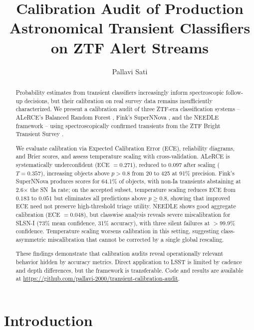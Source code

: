 \documentclass[twocolumn]{aastex631}
\begin{document}
\title{Calibration Audit of Production Astronomical Transient Classifiers on ZTF Alert Streams}

\author{Pallavi Sati}

\begin{abstract}
Probability estimates from transient classifiers increasingly inform
spectroscopic follow-up decisions, but their calibration on real survey
data remains insufficiently characterized. We present a calibration audit
of three ZTF-era classification systems -- ALeRCE's Balanced Random Forest
\citep{forster2021}, Fink's SuperNNova \citep{moller2020}, and the NEEDLE
framework \citep{sheng2024} -- using spectroscopically confirmed transients
from the ZTF Bright Transient Survey \citep{fremling2020}.

We evaluate calibration via Expected Calibration Error (ECE), reliability
diagrams, and Brier scores, and assess temperature scaling \citep{guo2017}
with cross-validation. ALeRCE is systematically underconfident
(ECE $= 0.271$), reduced to $0.097$ after scaling ($T = 0.357$),
increasing objects above $p > 0.8$ from 20 to 425 at 91\% precision.
Fink's SuperNNova produces scores for 64.1\% of objects, with non-Ia
transients abstaining at 2.6$\times$ the SN~Ia rate; on the accepted
subset, temperature scaling reduces ECE from $0.183$ to $0.051$ but
eliminates all predictions above $p \geq 0.8$, showing that improved
ECE need not preserve high-threshold triage utility. NEEDLE shows good
aggregate calibration (ECE $= 0.048$), but classwise analysis reveals
severe miscalibration for SLSN-I (73\% mean confidence, 31\% accuracy),
with three silent failures at $>$99.9\% confidence. Temperature scaling
worsens calibration in this setting, suggesting class-asymmetric
miscalibration that cannot be corrected by a single global rescaling.

These findings demonstrate that calibration audits reveal operationally
relevant behavior hidden by accuracy metrics. Direct application to LSST
is limited by cadence and depth differences, but the framework is
transferable. Code and results are available at
\url{https://github.com/pallavi-2000/transient-calibration-audit}.
\end{abstract}


\section{Introduction} \label{sec:intro}
\end{document}
